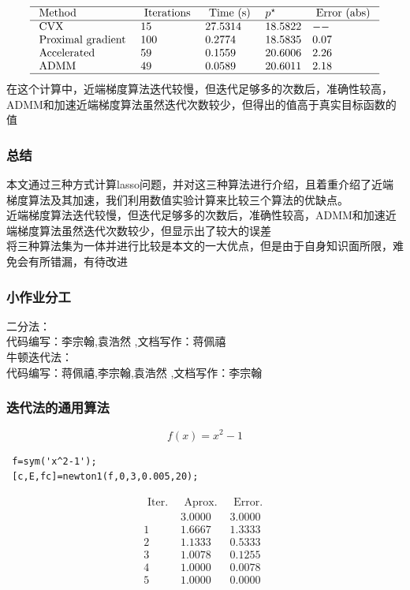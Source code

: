 \documentclass[10pt,aspectratio=43,mathserif,dvipsnames,svgnames,x11names]{beamer}
\begin{document}
	\begin{frame}
		$$\begin{array}{llllll}
		\hline \text { Method } & \text { Iterations } & \text { Time (s) } & p^{\star} & \text { Error (abs) }  \\
		\hline \text { CVX } & 15 &   27.5314 & 18.5822 & - - \\
		\text { Proximal gradient } & 100 & 0.2774 & 18.5835 & 0.07  \\
		\text { Accelerated } &59 & 0.1559 & 20.6006 & 2.26  \\
		\text { ADMM } & 49 &  0.0589 & 20.6011 & 2.18  \\
		\hline
		\end{array}$$
			在这个计算中，近端梯度算法迭代较慢，但迭代足够多的次数后，准确性较高，ADMM和加速近端梯度算法虽然迭代次数较少，但得出的值高于真实目标函数的值
	\end{frame}
	\begin{frame}
				\frametitle{总结}
\noindent 本文通过三种方式计算lasso问题，并对这三种算法进行介绍，且着重介绍了近端梯度算法及其加速，我们利用数值实验计算来比较三个算法的优缺点。\\
近端梯度算法迭代较慢，但迭代足够多的次数后，准确性较高，ADMM和加速近端梯度算法虽然迭代次数较少，但显示出了较大的误差\\
将三种算法集为一体并进行比较是本文的一大优点，但是由于自身知识面所限，难免会有所错漏，有待改进
	\end{frame}
		\begin{frame}
				\frametitle{小作业分工}
			二分法：\\ 代码编写：李宗翰,袁浩然 ,文档写作：蒋佩禧\\
牛顿迭代法：\\ 代码编写：蒋佩禧,李宗翰,袁浩然 ,文档写作：李宗翰	
					\end{frame}
\begin{frame}[fragile]
\frametitle{迭代法的通用算法}
$$f(x)=x^2-1$$
\begin{lstlisting}
 f=sym('x^2-1');
 [c,E,fc]=newton1(f,0,3,0.005,20);
\end{lstlisting}
$$\begin{array}{lll}
\text { Iter. } & \text { Aprox. } & \text { Error. } \\
\text {  } & 3.0000 & 3.0000 \\
1 & 1.6667 & 1.3333 \\
2 & 1.1333 & 0.5333 \\
3 & 1.0078 & 0.1255 \\
4 & 1.0000 & 0.0078 \\
5 & 1.0000 & 0.0000
\end{array}$$
\end{frame}
\end{document}
